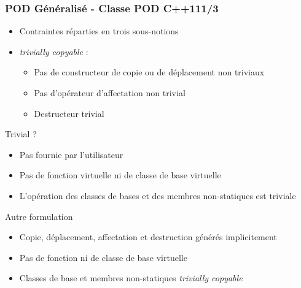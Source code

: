 \documentclass[C++.tex]{subfiles}
\begin{document}
\begin{frame}[fragile]
	\frametitle{POD Généralisé - Classe POD C++11\titlehfill{}1/3}
	\begin{itemize}
		\item Contraintes réparties en trois sous-notions
		\item \textit{trivially copyable} :
		\begin{itemize}
			\item Pas de constructeur de copie ou de déplacement non triviaux
			\item Pas d'opérateur d'affectation non trivial
			\item Destructeur trivial
		\end{itemize}
	\end{itemize}

	\pause

	\begin{block}{Trivial ?}
		\begin{itemize}
			\item Pas fournie par l'utilisateur
			\item Pas de fonction virtuelle ni de classe de base virtuelle
			\item L'opération des classes de bases et des membres non-statiques est triviale
		\end{itemize}
	\end{block}

	\pause

	\begin{block}{Autre formulation}
		\begin{itemize}
			\item Copie, déplacement, affectation et destruction générés implicitement
			\item Pas de fonction ni de classe de base virtuelle
			\item Classes de base et membres non-statiques \textit{trivially copyable}
		\end{itemize}
	\end{block}
\end{frame}
\end{document}
